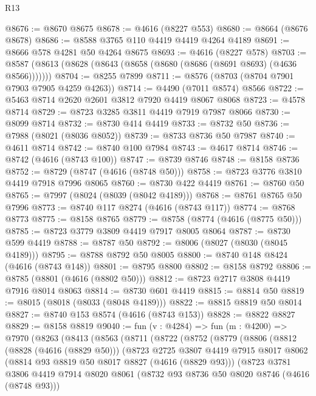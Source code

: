 \begin{lexlean}{R13}
\begin{coremodule}
@8676 := @8670 @8675
@8678 := @4616 (@8227 @553)
@8680 := @8664 (@8676 @8678)
@8686 := @8588 @3765 @110 @4419 @4419 @4264 @4189
@8691 := @8666 @578 @4281 @50 @4264 @8675
@8693 := @4616 (@8227 @578)
@8703 := @8587 (@8613 (@8628 (@8643 (@8658 (@8680 (@8686 (@8691 @8693) (@4636 @8566)))))))
@8704 := @8255 @7899
@8711 := @8576 (@8703 (@8704 @7901 @7903 @7905 @4259 @4263))
@8714 := @4490 (@7011 @8574) @8566
@8722 := @5463 @8714 @2620 @2601 @3812 @7920 @4419 @8067 @8068
@8723 := @4578 @8714
@8729 := @8723 @3285 @3811 @4419 @7919 @7987 @8066
@8730 := @8099 @8714
@8732 := @8730 @414 @4419
@8733 := @8732 @50
@8736 := @7988 (@8021 (@8036 @8052))
@8739 := @8733 @8736 @50 @7987
@8740 := @4611 @8714
@8742 := @8740 @100 @7984
@8743 := @4617 @8714
@8746 := @8742 (@4616 (@8743 @100))
@8747 := @8739 @8746
@8748 := @8158 @8736
@8752 := @8729 (@8747 (@4616 (@8748 @50)))
@8758 := @8723 @3776 @3810 @4419 @7918 @7996 @8065
@8760 := @8730 @422 @4419
@8761 := @8760 @50
@8765 := @7997 (@8024 (@8039 (@8042 @4189)))
@8768 := @8761 @8765 @50 @7996
@8773 := @8740 @117 @8274 (@4616 (@8743 @117))
@8774 := @8768 @8773
@8775 := @8158 @8765
@8779 := @8758 (@8774 (@4616 (@8775 @50)))
@8785 := @8723 @3779 @3809 @4419 @7917 @8005 @8064
@8787 := @8730 @599 @4419
@8788 := @8787 @50
@8792 := @8006 (@8027 (@8030 (@8045 @4189)))
@8795 := @8788 @8792 @50 @8005
@8800 := @8740 @148 @8424 (@4616 (@8743 @148))
@8801 := @8795 @8800
@8802 := @8158 @8792
@8806 := @8785 (@8801 (@4616 (@8802 @50)))
@8812 := @8723 @2717 @3808 @4419 @7916 @8014 @8063
@8814 := @8730 @601 @4419
@8815 := @8814 @50
@8819 := @8015 (@8018 (@8033 (@8048 @4189)))
@8822 := @8815 @8819 @50 @8014
@8827 := @8740 @153 @8574 (@4616 (@8743 @153))
@8828 := @8822 @8827
@8829 := @8158 @8819
@9040 := fun (v : @4284) =>
  fun (m : @4200) =>
  @7970
    (@8263
      (@8413
        (@8563
          (@8711
            (@8722
              (@8752
                (@8779
                  (@8806
                    (@8812
                      (@8828 (@4616 (@8829 @50)))
                      (@8723
                        @2725
                        @3807
                        @4419
                        @7915
                        @8017
                        @8062
                        (@8814 @93 @8819 @50 @8017 @8827 (@4616 (@8829 @93)))
                        (@8723
                          @3781
                          @3806
                          @4419
                          @7914
                          @8020
                          @8061
                          (@8732 @93 @8736 @50 @8020 @8746 (@4616 (@8748 @93)))

\end{coremodule}
\end{lexlean}
